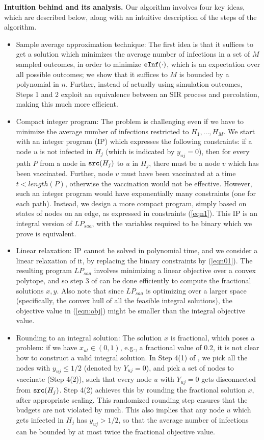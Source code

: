 \noindent
\textbf{Intuition behind \algo{} and its analysis.}
Our algorithm involves four key ideas, which are described below, along with an intuitive description of
the steps of the algorithm.
\begin{itemize}[leftmargin=0.1in, noitemsep, topsep=0pt]
\item
Sample average approximation technique: 
The first idea is that it suffices to get a solution which minimizes the average number of
infections in a set of $M$ sampled outcomes, in order to minimize $\texttt{eInf}(\cdot)$, which is an expectation
over all possible outcomes; we show that it suffices to $M$ is bounded by a polynomial in $n$.
Further, instead of actually using simulation outcomes, Steps 1 and 2 exploit an equivalence between an
SIR process and percolation, making this much more efficient.
\item
Compact integer program:
The problem is challenging even if we have to minimize the average number of infections restricted to
$H_1,\ldots,H_M$. We start with an integer program (IP) which expresses the following constraints: if a node $u$ is not infected in $H_j$
(which is indicated by $y_{uj}=0$), then for every path $P$ from a node in $\texttt{src}(H_j)$ to $u$ in $H_j$, there must be
a node $v$ which has been vaccinated. Further, node $v$ must have been vaccinated at a time $t< length(P)$, otherwise the
vaccination would not be effective. 
However, such an integer program would have exponentially many constraints (one for each path).
Instead, we design a more compact program,
simply based on states of nodes on an edge, as expressed in constraints (\ref{eqn1}).
This IP is an  integral version of $LP_{saa}$, with the variables required to be binary
which we prove is equivalent.
\item
Linear relaxation:
IP cannot be solved in polynomial time, and we consider a linear relaxation of it, by replacing the binary constraints
by (\ref{eqn01}). The resulting program $LP_{saa}$ involves minimizing a linear objective over a convex polytope,
and so step 3 of \algo{} can be done efficiently to compute the fractional solutions $x, y$.
Also note that since $LP_{saa}$ is optimizing over a larger space (specifically, the convex hull of all the
feasible integral solutions), the objective value in (\ref{eqn:obj}) might be smaller than the integral objective value.
\item
Rounding to an integral solution:
The solution $x$ is fractional, which poses a problem:
if we have $x_{ut}\in(0, 1)$, e.g., a fractional value of $0.2$, it is not clear how to construct
a valid integral solution. In Step 4(1) of \algo{}, we pick all the nodes with $y_{uj}\leq 1/2$ (denoted by $Y_{uj}=0$),
and pick a set of nodes to vaccinate (Step 4(2)), such that every node $u$ with $Y_{uj}=0$ gets disconnected from $\texttt{src}(H_j)$.
Step 4(2) achieves this by rounding the fractional solution $x$, after appropriate scaling.
This randomized rounding step ensures that the budgets are not violated by much.
This also implies that any node $u$ which gets infected in $H_j$ has $y_{uj}>1/2$, so that the average number
of infections can be bounded by at most twice the fractional objective value.
\end{itemize}

